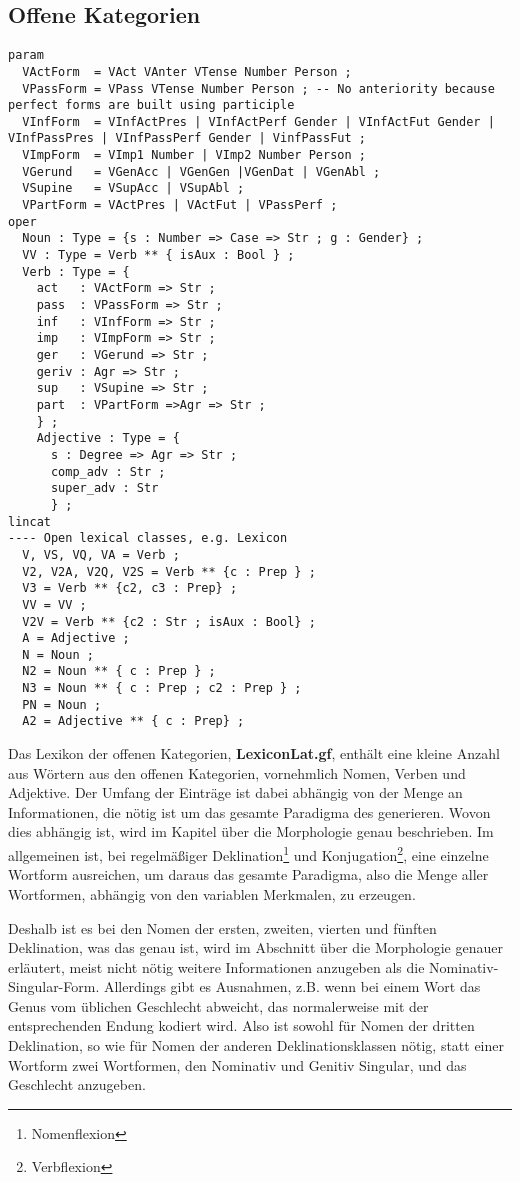 \subsection{Offene Kategorien}
\label{subsec:offene}
\begin{lstlisting}[float=h!tp,caption={Für \textbf{LexiconLat.gf} nötige \texttt{lincat}-Definitionen für offene Kategorien},label={GF-Lexicon-Lincat},basicstyle=\small]
param 
  VActForm  = VAct VAnter VTense Number Person ;
  VPassForm = VPass VTense Number Person ; -- No anteriority because perfect forms are built using participle
  VInfForm  = VInfActPres | VInfActPerf Gender | VInfActFut Gender | VInfPassPres | VInfPassPerf Gender | VinfPassFut ;
  VImpForm  = VImp1 Number | VImp2 Number Person ;
  VGerund   = VGenAcc | VGenGen |VGenDat | VGenAbl ;
  VSupine   = VSupAcc | VSupAbl ;
  VPartForm = VActPres | VActFut | VPassPerf ;
oper
  Noun : Type = {s : Number => Case => Str ; g : Gender} ;
  VV : Type = Verb ** { isAux : Bool } ;
  Verb : Type = {
    act   : VActForm => Str ;
    pass  : VPassForm => Str ;
    inf   : VInfForm => Str ;
    imp   : VImpForm => Str ;
    ger   : VGerund => Str ;
    geriv : Agr => Str ; 
    sup   : VSupine => Str ;
    part  : VPartForm =>Agr => Str ;
    } ;
    Adjective : Type = {
      s : Degree => Agr => Str ;
      comp_adv : Str ; 
      super_adv : Str 
      } ;
lincat
---- Open lexical classes, e.g. Lexicon
  V, VS, VQ, VA = Verb ; 
  V2, V2A, V2Q, V2S = Verb ** {c : Prep } ;
  V3 = Verb ** {c2, c3 : Prep} ;
  VV = VV ;
  V2V = Verb ** {c2 : Str ; isAux : Bool} ;
  A = Adjective ;
  N = Noun ;
  N2 = Noun ** { c : Prep } ;
  N3 = Noun ** { c : Prep ; c2 : Prep } ;
  PN = Noun ;
  A2 = Adjective ** { c : Prep} ;
\end{lstlisting}
Das Lexikon der offenen Kategorien, \textbf{LexiconLat.gf}, enthält eine kleine Anzahl aus Wörtern aus den offenen Kategorien, vornehmlich Nomen, Verben und Adjektive. Der Umfang der Einträge ist dabei abhängig von der Menge an Informationen, die nötig ist um das gesamte Paradigma des generieren. Wovon dies abhängig ist, wird im Kapitel über die Morphologie genau beschrieben. Im allgemeinen ist, bei regelmäßiger Deklination\footnote{Nomenflexion} und Konjugation\footnote{Verbflexion}, eine einzelne Wortform ausreichen, um daraus das gesamte Paradigma, also die Menge aller Wortformen, abhängig von den variablen Merkmalen, zu erzeugen. \par
Deshalb ist es bei den Nomen der ersten, zweiten, vierten und fünften Deklination, was das genau ist, wird im Abschnitt über die Morphologie genauer erläutert, meist nicht nötig weitere Informationen anzugeben als die Nominativ-Singular-Form. Allerdings gibt es Ausnahmen, z.B. wenn bei einem Wort das Genus vom üblichen Geschlecht abweicht, das normalerweise mit der entsprechenden Endung kodiert wird. Also ist sowohl für Nomen der dritten Deklination, so wie für Nomen der anderen Deklinationsklassen nötig, statt einer Wortform zwei Wortformen, den Nominativ und Genitiv Singular, und das Geschlecht anzugeben. \par
